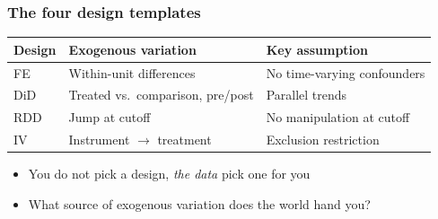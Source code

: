 \begin{frame}
\frametitle{The four design templates}
\centering

\vspace{10pt}

\renewcommand{\arraystretch}{1.3}
\footnotesize
\begin{tabular}{p{1.6cm}p{3.5cm}p{4cm}}
\hline
\textbf{Design} & \textbf{Exogenous variation} & \textbf{Key assumption}\\
\hline
FE & Within-unit differences & No time-varying confounders\\
DiD & Treated vs.\ comparison, pre/post & Parallel trends\\
RDD & Jump at cutoff & No manipulation at cutoff\\
IV & Instrument $\rightarrow$ treatment & Exclusion restriction\\
\hline
\end{tabular}

\vspace{12pt}

\begin{itemize}
\item \footnotesize You do not pick a design, \textit{the data} pick one for you
\item \footnotesize What source of exogenous variation does the world hand you?
\end{itemize}

\end{frame}

